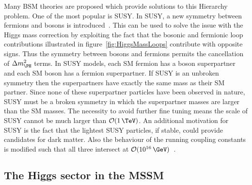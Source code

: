Many \ac{BSM} theories are proposed which provide solutions to this Hierarchy
problem. One of the most popular is \ac{SUSY}. In \ac{SUSY}, a new
symmetry between fermions and bosons is introduced~\cite{Martin:1997ns}. This
can be used to solve the issue with the Higgs mass correction by exploiting the
fact that the bosonic and fermionic loop contributions illustrated in 
figure~\ref{fig:HiggsMassLoops} contribute with opposite signs. Thus the symmetry
between bosons and fermions permits the cancellation of $\Delta m_{\PH}^{2}$
terms. In SUSY models, each \ac{SM} fermion has a boson superpartner and each
\ac{SM} boson has a fermion superpartner. If \ac{SUSY} is an unbroken symmetry then
the superpartners have exactly the same mass as their \ac{SM} partner. Since
none of these superpartner particles have been observed in nature, \ac{SUSY} must be
a broken symmetry in which the superpartner masses are larger than the
\ac{SM} masses. The necessity to avoid further fine tuning means the scale of
\ac{SUSY} cannot be much larger than $\mathcal{O}(1\,\TeV)$. An additional motivation
for \ac{SUSY} is the fact that the lightest \ac{SUSY} particles, if stable, could provide
candidates for dark matter. Also the behaviour of the running coupling
constants is modified such that all three intersect at
$\mathcal{O}(10^{16}\,\GeV)$~\cite{Amaldi:1991cn}.

\subsection{The Higgs sector in the MSSM}
\label{sec:mssmhiggs}

